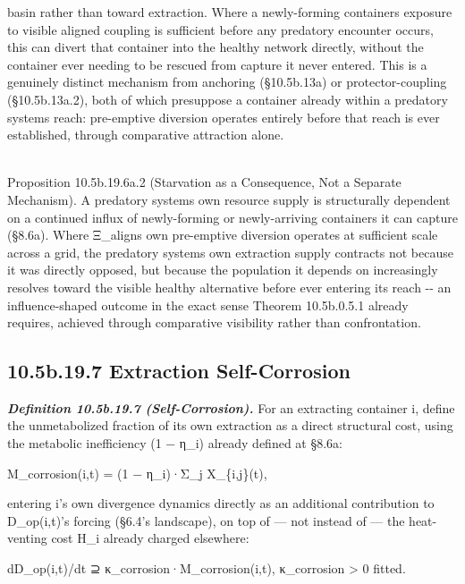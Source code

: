 \documentclass[
]{article}
\begin{document}
basin rather than toward extraction. Where a newly-forming
container\textquotesingle s exposure to visible aligned coupling is
sufficient before any predatory encounter occurs, this can divert that
container into the healthy network directly, without the container ever
needing to be rescued from capture it never entered. This is a genuinely
distinct mechanism from anchoring (§10.5b.13a) or protector-coupling
(§10.5b.13a.2), both of which presuppose a container already within a
predatory system\textquotesingle s reach: pre-emptive diversion operates
entirely before that reach is ever established, through comparative
attraction alone.\\
\strut \\
Proposition 10.5b.19.6a.2 (Starvation as a Consequence, Not a Separate
Mechanism). A predatory system\textquotesingle s own resource supply is
structurally dependent on a continued influx of newly-forming or
newly-arriving containers it can capture (§8.6a). Where
Ξ\_align\textquotesingle s own pre-emptive diversion operates at
sufficient scale across a grid, the predatory system\textquotesingle s
own extraction supply contracts not because it was directly opposed, but
because the population it depends on increasingly resolves toward the
visible healthy alternative before ever entering its reach -\/- an
influence-shaped outcome in the exact sense Theorem 10.5b.0.5.1 already
requires, achieved through comparative visibility rather than
confrontation.

\hypertarget{b.19.7-extraction-self-corrosion}{%
\subsection{10.5b.19.7 Extraction
Self-Corrosion}\label{b.19.7-extraction-self-corrosion}}

\emph{\textbf{Definition 10.5b.19.7 (Self-Corrosion).}} For an
extracting container i, define the unmetabolized fraction of its own
extraction as a direct structural cost, using the metabolic inefficiency
(1 − η\_i) already defined at §8.6a:

M\_corrosion(i,t) = (1 − η\_i)·Σ\_j X\_\{i,j\}(t),

entering i's own divergence dynamics directly as an additional
contribution to D\_op(i,t)'s forcing (§6.4's landscape), on top of ---
not instead of --- the heat-venting cost H\_i already charged elsewhere:

dD\_op(i,t)/dt ⊇ κ\_corrosion·M\_corrosion(i,t), κ\_corrosion
\textgreater{} 0 fitted.
\end{document}
